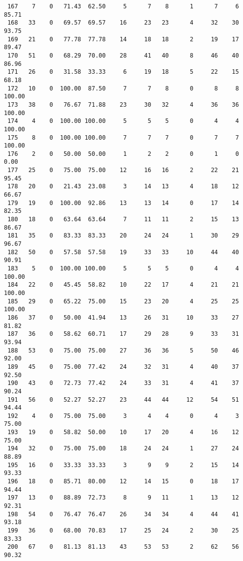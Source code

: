 \begin{verbatim}
 167    7    0   71.43  62.50     5      7    8      1      7     6    85.71
 168   33    0   69.57  69.57    16     23   23      4     32    30    93.75
 169   21    0   77.78  77.78    14     18   18      2     19    17    89.47
 170   51    0   68.29  70.00    28     41   40      8     46    40    86.96
 171   26    0   31.58  33.33     6     19   18      5     22    15    68.18
 172   10    0  100.00  87.50     7      7    8      0      8     8   100.00
 173   38    0   76.67  71.88    23     30   32      4     36    36   100.00
 174    4    0  100.00 100.00     5      5    5      0      4     4   100.00
 175    8    0  100.00 100.00     7      7    7      0      7     7   100.00
 176    2    0   50.00  50.00     1      2    2      0      1     0     0.00
 177   25    0   75.00  75.00    12     16   16      2     22    21    95.45
 178   20    0   21.43  23.08     3     14   13      4     18    12    66.67
 179   19    0  100.00  92.86    13     13   14      0     17    14    82.35
 180   18    0   63.64  63.64     7     11   11      2     15    13    86.67
 181   35    0   83.33  83.33    20     24   24      1     30    29    96.67
 182   50    0   57.58  57.58    19     33   33     10     44    40    90.91
 183    5    0  100.00 100.00     5      5    5      0      4     4   100.00
 184   22    0   45.45  58.82    10     22   17      4     21    21   100.00
 185   29    0   65.22  75.00    15     23   20      4     25    25   100.00
 186   37    0   50.00  41.94    13     26   31     10     33    27    81.82
 187   36    0   58.62  60.71    17     29   28      9     33    31    93.94
 188   53    0   75.00  75.00    27     36   36      5     50    46    92.00
 189   45    0   75.00  77.42    24     32   31      4     40    37    92.50
 190   43    0   72.73  77.42    24     33   31      4     41    37    90.24
 191   56    0   52.27  52.27    23     44   44     12     54    51    94.44
 192    4    0   75.00  75.00     3      4    4      0      4     3    75.00
 193   19    0   58.82  50.00    10     17   20      4     16    12    75.00
 194   32    0   75.00  75.00    18     24   24      1     27    24    88.89
 195   16    0   33.33  33.33     3      9    9      2     15    14    93.33
 196   18    0   85.71  80.00    12     14   15      0     18    17    94.44
 197   13    0   88.89  72.73     8      9   11      1     13    12    92.31
 198   54    0   76.47  76.47    26     34   34      4     44    41    93.18
 199   36    0   68.00  70.83    17     25   24      2     30    25    83.33
 200   67    0   81.13  81.13    43     53   53      2     62    56    90.32

\end{verbatim}
